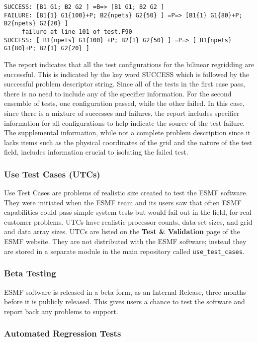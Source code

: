 \begin{verbatim}
SUCCESS: [B1 G1; B2 G2 ] =B=> [B1 G1; B2 G2 ] 
FAILURE: [B1{1} G1{100}+P; B2{npets} G2{50} ] =P=> [B1{1} G1{80}+P; B2{npets} G2{20} ] 
     failure at line 101 of test.F90
SUCCESS: [ B1{npets} G1{100} +P; B2{1} G2{50} ] =P=> [ B1{npets} G1{80}+P; B2{1} G2{20} ] 
\end{verbatim}

The report indicates that all the test configurations for the bilinear regridding
are successful. This is indicated by the key word SUCCESS which is followed by the 
successful problem descriptor string. Since all of the tests in the first case pass,
there is no need to include any of the specifier information. For the second
ensemble of tests, one configuration passed, while the other failed. In this case,
since there is a mixture of successes and failures, the report includes 
specifier information for all configurations to help indicate the source of the
test failure. The supplemental information, while not a complete problem description
since it lacks items such as the physical coordinates of the grid and the nature of 
the test field, includes information crucial to isolating the failed test.


\subsubsection{Use Test Cases (UTCs)}

Use Test Cases are problems of realistic size created to test the ESMF
software.  They were initiated when the ESMF team and its users saw that
often ESMF capabilities could pass simple system tests but would fail
out in the field, for real customer problems.  UTCs have realistic
processor counts, data set sizes, and grid and data array sizes.  UTCs are
listed on the {\bf Test \& Validation} page of the ESMF website.  They
are not distributed with the ESMF software; instead they are stored in
a separate module in the main repository called {\tt use\_test\_cases}.

\subsubsection{Beta Testing}

ESMF software is released in a beta form, as an Internal Release,
three months before it is publicly released.  This gives users
a chance to test the software and report back any problems to 
support.

\subsubsection{Automated Regression Tests}

